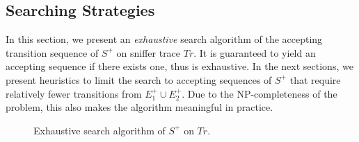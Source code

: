 \subsection{Searching Strategies}
\label{subsec:search}

In this section, we present an \textit{exhaustive} search algorithm of the
accepting transition sequence of $S^+$ on sniffer trace $Tr$. It is guaranteed to
yield an accepting sequence if there exists one, thus is exhaustive.  In the next
sections, we present heuristics to limit the search to accepting sequences of
$S^+$ that require relatively fewer transitions from $E^+_1 \cup E^+_2$.  Due to
the NP-completeness of the problem, this also makes the algorithm meaningful in
practice.

\begin{figure}[t!]
  \begin{minipage}{\textwidth}
    \begin{algorithm}[H]
      \caption{Exhaustive search algorithm of $S^+$ on $Tr$.}
      \label{alg:search}
      

\end{algorithm}
\end{minipage}
\end{figure}
